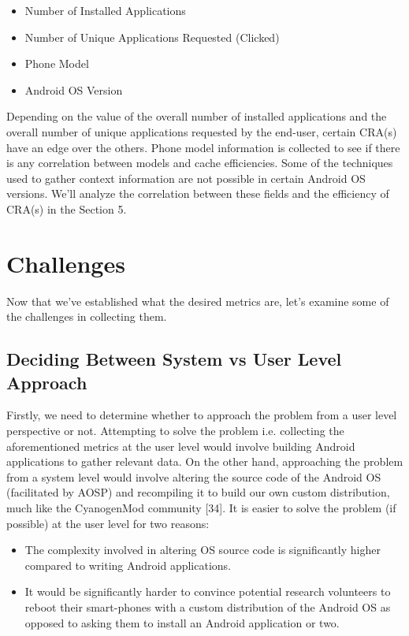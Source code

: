 \documentclass[12pt]{uthesis-v12}  %
\begin{document}
			\begin{itemize}
				\item Number of Installed Applications
				\item Number of Unique Applications Requested (Clicked)
				\item Phone Model
				\item Android OS Version
			\end{itemize} 
			
			Depending on the value of the overall number of installed applications and the overall number of unique applications requested by the end-user, certain CRA(s) have an edge over the others. Phone model information is collected to see if there is any correlation between models and cache efficiencies. Some of the techniques used to gather context information are not possible in certain Android OS versions. We'll analyze the correlation between these fields and the efficiency of CRA(s) in the Section 5.  
			
	\section{Challenges}
		Now that we've established what the desired metrics are, let's examine some of the challenges in collecting them.  
		
		\subsection{Deciding Between System vs User Level Approach}
			Firstly, we need to determine whether to approach the problem from a user level perspective or not. Attempting to solve the problem i.e. collecting the aforementioned metrics at the user level would involve building Android applications to gather relevant data. On the other hand, approaching the problem from a system level would involve altering the source code of the Android OS (facilitated by AOSP) and recompiling it to build our own custom distribution, much like the CyanogenMod community [34]. It is easier to solve the problem (if possible) at the user level for two reasons:
			
			\begin{itemize}
				\item The complexity involved in altering OS source code is significantly higher compared to writing Android applications.
				\item It would be significantly harder to convince potential research volunteers to reboot their smart-phones with a custom distribution of the Android OS as opposed to asking them to install an Android application or two.
			\end{itemize}
			
\end{document}

